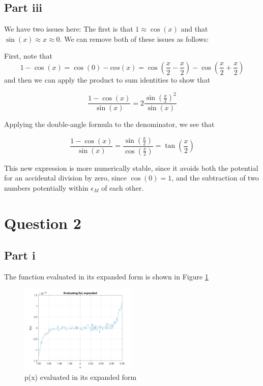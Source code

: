 \documentclass[12pt]{exam}
\begin{document}
\subsection*{Part iii}

We have two issues here: The first is that $1\approx \cos(x)$ and that $\sin(x)\approx x \approx 0$. We can remove both of these issues as follows:

First, note that
\begin{equation}
1-\cos(x) = \cos(0)-cos(x)=\cos\left(\frac{x}{2}-\frac{x}{2}\right)-\cos\left(\frac{x}{2}+\frac{x}{2}\right)
\end{equation}
and then we can apply the product to sum identities to show that 

\begin{equation}
\frac{1-\cos(x)}{\sin(x)} = 2\frac{\sin\left(\frac{x}{2}\right)^2}{\sin(x)}
\end{equation}

Applying the double-angle formula to the denominator, we see that 

\begin{equation}
\frac{1-\cos(x)}{\sin(x)} = \frac{\sin\left(\frac{x}{2}\right)}{\cos\left(\frac{x}{2}\right)}=\tan\left(\frac{x}{2}\right)
\end{equation}

This new expression is more numerically stable, since it avoids both the potential for an accidental division by zero, since $\cos(0)=1$, and the subtraction of two numbers potentially within $\epsilon_M$ of each other. 
\newpage

\section*{Question 2}

\subsection*{Part i}
The function evaluated in its expanded form is shown in Figure \ref{fig:expanded}
\begin{figure}[h!]
\centering
\includegraphics[width=0.5\textwidth]{q2p1.png}
\caption{p(x) evaluated in its expanded form}\label{fig:expanded}
\end{figure}
\end{document}
